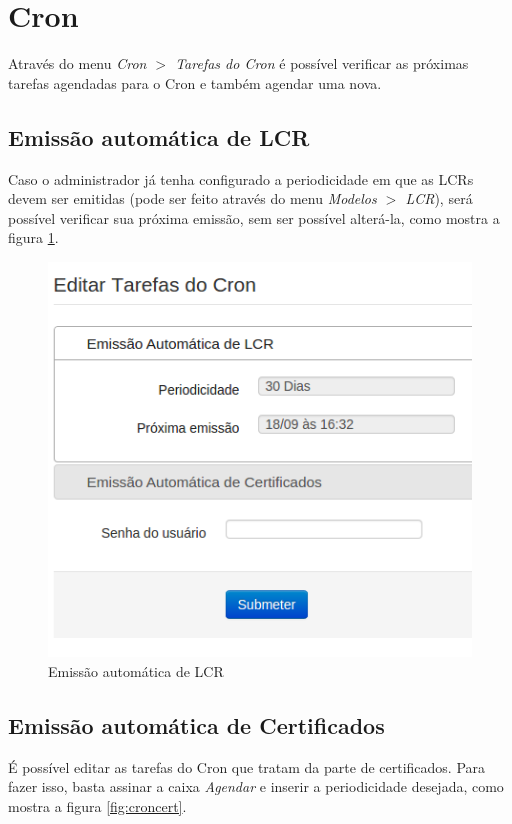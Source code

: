 \section{Cron}

Através do menu \textit{Cron $>$ Tarefas do Cron} é possível verificar as próximas tarefas agendadas para o Cron e também agendar uma nova.

\subsection{Emissão automática de LCR}

Caso o administrador já tenha configurado a periodicidade em que as LCRs devem ser emitidas (pode ser feito através do menu \textit{Modelos $>$ LCR}), será possível verificar sua próxima emissão, sem ser possível alterá-la, como mostra a figura \ref{fig:cron}.

\begin{figure}[ht]
     \centering
     \includegraphics[scale=0.5]{images/cron.png}
     \caption{Emissão automática de LCR}
     \label{fig:cron}
\end{figure}

\subsection{Emissão automática de Certificados}

É possível editar as tarefas do Cron que tratam da parte de certificados. Para fazer isso, basta assinar a caixa \textit{Agendar} e inserir a periodicidade desejada, como mostra a figura \ref{fig:croncert}.

